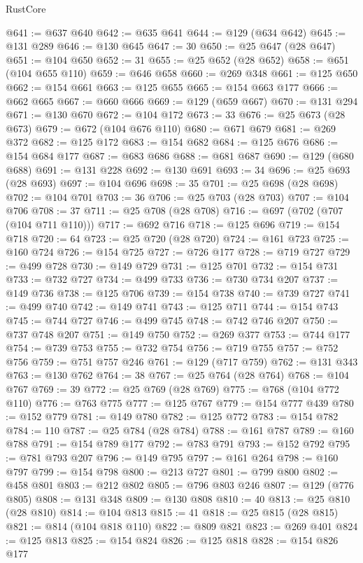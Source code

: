 \begin{lexlean}{RustCore}
\begin{coremodule}
@641 := @637 @640
@642 := @635 @641
@644 := @129 (@634 @642)
@645 := @131 @289
@646 := @130 @645
@647 := 30
@650 := @25 @647 (@28 @647)
@651 := @104 @650
@652 := 31
@655 := @25 @652 (@28 @652)
@658 := @651 (@104 @655 @110)
@659 := @646 @658
@660 := @269 @348
@661 := @125 @650
@662 := @154 @661
@663 := @125 @655
@665 := @154 @663 @177
@666 := @662 @665
@667 := @660 @666
@669 := @129 (@659 @667)
@670 := @131 @294
@671 := @130 @670
@672 := @104 @172
@673 := 33
@676 := @25 @673 (@28 @673)
@679 := @672 (@104 @676 @110)
@680 := @671 @679
@681 := @269 @372
@682 := @125 @172
@683 := @154 @682
@684 := @125 @676
@686 := @154 @684 @177
@687 := @683 @686
@688 := @681 @687
@690 := @129 (@680 @688)
@691 := @131 @228
@692 := @130 @691
@693 := 34
@696 := @25 @693 (@28 @693)
@697 := @104 @696
@698 := 35
@701 := @25 @698 (@28 @698)
@702 := @104 @701
@703 := 36
@706 := @25 @703 (@28 @703)
@707 := @104 @706
@708 := 37
@711 := @25 @708 (@28 @708)
@716 := @697 (@702 (@707 (@104 @711 @110)))
@717 := @692 @716
@718 := @125 @696
@719 := @154 @718
@720 := 64
@723 := @25 @720 (@28 @720)
@724 := @161 @723
@725 := @160 @724
@726 := @154 @725
@727 := @726 @177
@728 := @719 @727
@729 := @499 @728
@730 := @149 @729
@731 := @125 @701
@732 := @154 @731
@733 := @732 @727
@734 := @499 @733
@736 := @730 @734 @207
@737 := @149 @736
@738 := @125 @706
@739 := @154 @738
@740 := @739 @727
@741 := @499 @740
@742 := @149 @741
@743 := @125 @711
@744 := @154 @743
@745 := @744 @727
@746 := @499 @745
@748 := @742 @746 @207
@750 := @737 @748 @207
@751 := @149 @750
@752 := @269 @377
@753 := @744 @177
@754 := @739 @753
@755 := @732 @754
@756 := @719 @755
@757 := @752 @756
@759 := @751 @757 @246
@761 := @129 (@717 @759)
@762 := @131 @343
@763 := @130 @762
@764 := 38
@767 := @25 @764 (@28 @764)
@768 := @104 @767
@769 := 39
@772 := @25 @769 (@28 @769)
@775 := @768 (@104 @772 @110)
@776 := @763 @775
@777 := @125 @767
@779 := @154 @777 @439
@780 := @152 @779
@781 := @149 @780
@782 := @125 @772
@783 := @154 @782
@784 := 110
@787 := @25 @784 (@28 @784)
@788 := @161 @787
@789 := @160 @788
@791 := @154 @789 @177
@792 := @783 @791
@793 := @152 @792
@795 := @781 @793 @207
@796 := @149 @795
@797 := @161 @264
@798 := @160 @797
@799 := @154 @798
@800 := @213 @727
@801 := @799 @800
@802 := @458 @801
@803 := @212 @802
@805 := @796 @803 @246
@807 := @129 (@776 @805)
@808 := @131 @348
@809 := @130 @808
@810 := 40
@813 := @25 @810 (@28 @810)
@814 := @104 @813
@815 := 41
@818 := @25 @815 (@28 @815)
@821 := @814 (@104 @818 @110)
@822 := @809 @821
@823 := @269 @401
@824 := @125 @813
@825 := @154 @824
@826 := @125 @818
@828 := @154 @826 @177

\end{coremodule}
\end{lexlean}
